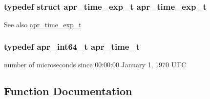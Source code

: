 \subsubsection[{\texorpdfstring{apr\+\_\+time\+\_\+exp\+\_\+t}{apr_time_exp_t}}]{\setlength{\rightskip}{0pt plus 5cm}typedef struct {\bf apr\+\_\+time\+\_\+exp\+\_\+t} {\bf apr\+\_\+time\+\_\+exp\+\_\+t}}\hypertarget{group__apr__time_gae28f2767111a534f263ced95a28489b1}{}\label{group__apr__time_gae28f2767111a534f263ced95a28489b1}
\begin{DoxySeeAlso}{See also}
\hyperlink{structapr__time__exp__t}{apr\+\_\+time\+\_\+exp\+\_\+t} 
\end{DoxySeeAlso}
\subsubsection[{\texorpdfstring{apr\+\_\+time\+\_\+t}{apr_time_t}}]{\setlength{\rightskip}{0pt plus 5cm}typedef apr\+\_\+int64\+\_\+t {\bf apr\+\_\+time\+\_\+t}}\hypertarget{group__apr__time_gadb4bde16055748190eae190c55aa02bb}{}\label{group__apr__time_gadb4bde16055748190eae190c55aa02bb}
number of microseconds since 00\+:00\+:00 January 1, 1970 U\+TC 

\subsection{Function Documentation}
